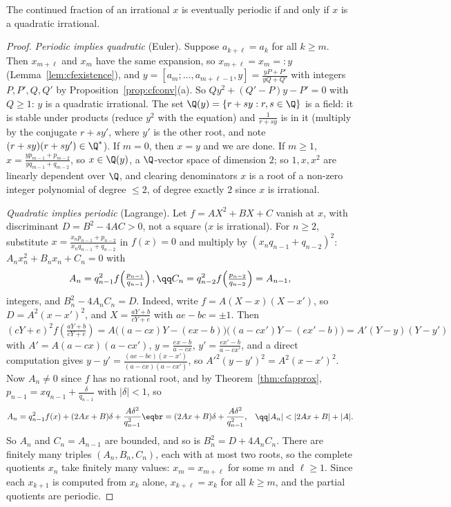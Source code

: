 \begin{theorem}\label{thm:periodic}
The continued fraction of an irrational $x$ is eventually periodic if and only if $x$ is a quadratic irrational.
\end{theorem}
\begin{proof}
\emph{Periodic implies quadratic} (Euler). Suppose $a_{k+\ell}=a_k$ for all $k\ge m$. Then $x_{m+\ell}$ and $x_m$ have the same expansion, so $x_{m+\ell}=x_m=:y$ (Lemma~\ref{lem:cfexistence}), and $y=[a_m;\dots,a_{m+\ell-1},y]=\frac{yP+P'}{yQ+Q'}$ with integers $P,P',Q,Q'$ by Proposition~\ref{prop:cfconv}(a). So $Qy^2+(Q'-P)y-P'=0$ with $Q\ge1$: $y$ is a quadratic irrational. The set $\Q(y)=\{r+sy:r,s\in\Q\}$ is a field: it is stable under products (reduce $y^2$ with the equation) and $\frac1{r+sy}$ is in it (multiply by the conjugate $r+sy'$, where $y'$ is the other root, and note $(r+sy)(r+sy')\in\Q^*$). If $m=0$, then $x=y$ and we are done. If $m\ge1$, $x=\frac{yp_{m-1}+p_{m-2}}{yq_{m-1}+q_{m-2}}$, so $x\in\Q(y)$, a $\Q$-vector space of dimension $2$; so $1,x,x^2$ are linearly dependent over $\Q$, and clearing denominators $x$ is a root of a non-zero integer polynomial of degree $\le2$, of degree exactly $2$ since $x$ is irrational.

\emph{Quadratic implies periodic} (Lagrange). Let $f=AX^2+BX+C$ vanish at $x$, with discriminant $D=B^2-4AC>0$, not a square ($x$ is irrational). For $n\ge2$, substitute $x=\frac{x_np_{n-1}+p_{n-2}}{x_nq_{n-1}+q_{n-2}}$ in $f(x)=0$ and multiply by $(x_nq_{n-1}+q_{n-2})^2$: $A_nx_n^2+B_nx_n+C_n=0$ with
\[
\begin{gathered}A_n=q_{n-1}^2f\!\left(\tfrac{p_{n-1}}{q_{n-1}}\right),\qq C_n=q_{n-2}^2f\!\left(\tfrac{p_{n-2}}{q_{n-2}}\right)=A_{n-1},\end{gathered}
\]
integers, and $B_n^2-4A_nC_n=D$. Indeed, write $f=A(X-x)(X-x')$, so $D=A^2(x-x')^2$, and $X=\frac{aY+b}{cY+e}$ with $ae-bc=\pm1$. Then $(cY+e)^2f\!\left(\frac{aY+b}{cY+e}\right)=A\bigl((a-cx)Y-(ex-b)\bigr)\bigl((a-cx')Y-(ex'-b)\bigr)=A'(Y-y)(Y-y')$ with $A'=A(a-cx)(a-cx')$, $y=\frac{ex-b}{a-cx}$, $y'=\frac{ex'-b}{a-cx'}$, and a direct computation gives $y-y'=\frac{(ae-bc)(x-x')}{(a-cx)(a-cx')}$, so $A'^2(y-y')^2=A^2(x-x')^2$. Now $A_n\ne0$ since $f$ has no rational root, and by Theorem~\ref{thm:cfapprox}, $p_{n-1}=xq_{n-1}+\frac{\delta}{q_{n-1}}$ with $|\delta|<1$, so
\[
\begin{gathered}\begin{aligned}A_n&=q_{n-1}^2f(x)+(2Ax+B)\delta+\frac{A\delta^2}{q_{n-1}^2}\eqbr=(2Ax+B)\delta+\frac{A\delta^2}{q_{n-1}^2},\end{aligned}\qq|A_n|<|2Ax+B|+|A|.\end{gathered}
\]
So $A_n$ and $C_n=A_{n-1}$ are bounded, and so is $B_n^2=D+4A_nC_n$. There are finitely many triples $(A_n,B_n,C_n)$, each with at most two roots, so the complete quotients $x_n$ take finitely many values: $x_m=x_{m+\ell}$ for some $m$ and $\ell\ge1$. Since each $x_{k+1}$ is computed from $x_k$ alone, $x_{k+\ell}=x_k$ for all $k\ge m$, and the partial quotients are periodic.
\end{proof}

